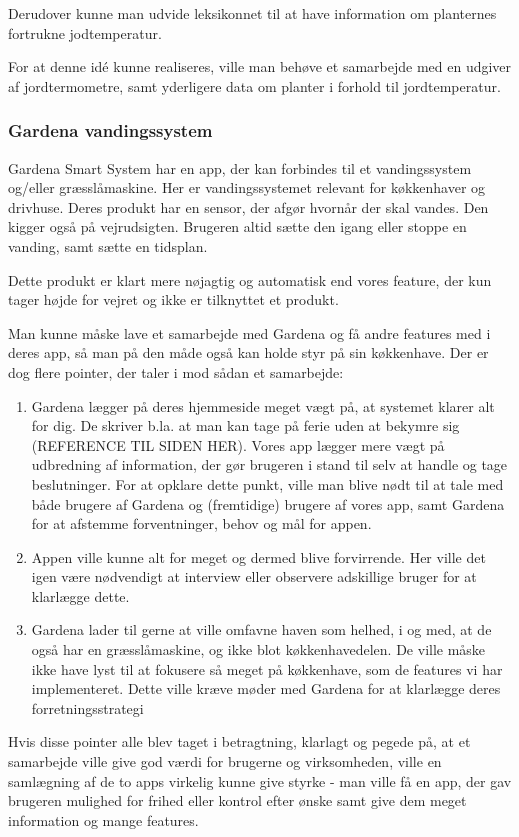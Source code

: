 Derudover kunne man udvide leksikonnet til at have information om planternes fortrukne jodtemperatur.

For at denne idé kunne realiseres, ville man behøve et samarbejde med en udgiver af jordtermometre, samt yderligere data om planter i forhold til jordtemperatur.

\subsubsection*{Gardena vandingssystem}
Gardena Smart System har en app, der kan forbindes til et vandingssystem og/eller græsslåmaskine. Her er vandingssystemet relevant for køkkenhaver og drivhuse. Deres produkt har en sensor, der afgør hvornår der skal vandes. Den kigger også på vejrudsigten. Brugeren altid sætte den igang eller stoppe en vanding, samt sætte en tidsplan.

Dette produkt er klart mere nøjagtig og automatisk end vores feature, der kun tager højde for vejret og ikke er tilknyttet et produkt.

Man kunne måske lave et samarbejde med Gardena og få andre features med i deres app, så man på den måde også kan holde styr på sin køkkenhave. Der er dog flere pointer, der taler i mod sådan et samarbejde:

\begin{enumerate}
    \item{Gardena lægger på deres hjemmeside meget vægt på, at systemet klarer alt for dig. De skriver b.la. at man kan tage på ferie uden at bekymre sig (REFERENCE TIL SIDEN HER). Vores app lægger mere vægt på udbredning af information, der gør brugeren i stand til selv at handle og tage beslutninger. For at opklare dette punkt, ville man blive nødt til at tale med både brugere af Gardena og (fremtidige) brugere af vores app, samt Gardena for at afstemme forventninger, behov og mål for appen.}
    \item{Appen ville kunne alt for meget og dermed blive forvirrende. Her ville det igen være nødvendigt at interview eller observere adskillige bruger for at klarlægge dette.}
    \item{Gardena lader til gerne at ville omfavne haven som helhed, i og med, at de også har en græsslåmaskine, og ikke blot køkkenhavedelen. De ville måske ikke have lyst til at fokusere så meget på køkkenhave, som de features vi har implementeret. Dette ville kræve møder med Gardena for at klarlægge deres forretningsstrategi}
\end{enumerate}

Hvis disse pointer alle blev taget i betragtning, klarlagt og pegede på, at et samarbejde ville give god værdi for brugerne og virksomheden, ville en samlægning af de to apps virkelig kunne give styrke - man ville få en app, der gav brugeren mulighed for frihed eller kontrol efter ønske samt give dem meget information og mange features. 



